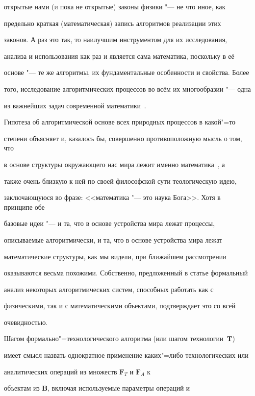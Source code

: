 открытые нами (и пока не открытые) законы физики "--- не что иное, как

предельно краткая (математическая) запись алгоритмов реализации этих

законов. А раз это так, то наилучшим инструментом для их исследования,

анализа и использования как раз и является сама математика, поскольку в её

основе "--- те же алгоритмы, их фундаментальные особенности и свойства. Более

того, исследование алгоритмических процессов во всём их многообразии "--- одна

из важнейших задач современной математики~\cite{krylov:bib10}.



Гипотеза об алгоритмической основе всех природных процессов в какой"=то

степени объясняет и, казалось бы, совершенно противоположную мысль о том, что

в основе структуры окружающего нас мира лежит именно математика~\cite{krylov:bib11}, а

также очень близкую к ней по своей философской сути теологическую идею,

заключающуюся во фразе: <<математика "--- это наука Бога>>. Хотя в принципе обе

базовые идеи "--- и та, что в основе устройства мира лежат процессы,

описываемые алгоритмически, и та, что в основе устройства мира лежат

математические структуры, как мы видели, при ближайшем рассмотрении

оказываются весьма похожими. Собственно, предложенный в статье формальный

анализ некоторых алгоритмических систем, способных работать как с

физическими, так и с математическими объектами, подтверждает это со всей

очевидностью.



Шагом формально"=технологического алгоритма (или шагом техноло\-гии~$\mathbf T$)

имеет смысл назвать однократное применение каких"=либо технологических или

аналитических операций из множеств $\mathbf{F}_{T}$ и $\mathbf{F}_{A}$ к

объектам из $\mathbf{B}$, включая используемые параметры операций и

